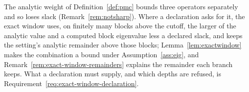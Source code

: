 
The analytic weight of Definition~\ref{def:pmc} bounds three operators
separately and so loses slack (Remark~\ref{rem:notsharp}). Where a
declaration asks for it, the exact window uses, on finitely many blocks
above the cutoff, the larger of the analytic value and a computed block
eigenvalue less a declared slack, and keeps the setting's analytic
remainder above those blocks; Lemma~\ref{lem:exactwindow} makes the
combination a bound under Assumption~\ref{ass:eig}, and
Remark~\ref{rem:exact-window-remainders} explains the remainder each branch
keeps. What a declaration must supply, and which depths are refused, is
Requirement~\ref{req:exact-window-declaration}.

